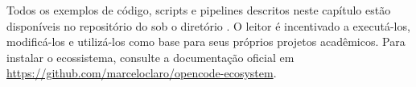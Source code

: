 \begin{observacao}
Todos os exemplos de código, scripts e pipelines descritos neste capítulo
estão disponíveis no repositório do \opencodeeco{} sob o diretório
. O leitor é incentivado a executá-los,
modificá-los e utilizá-los como base para seus próprios projetos acadêmicos.
Para instalar o ecossistema, consulte a documentação oficial em
\url{https://github.com/marceloclaro/opencode-ecosystem}.
\end{observacao}

